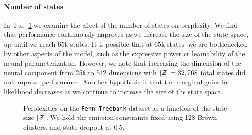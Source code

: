 \documentclass[11pt,a4paper]{article}
\begin{document}
\paragraph{Number of states}
In Tbl.~\ref{tbl:states-ablation} we examine the effect of the 
number of states on perplexity.
We find that performance continuously improves as we increase
the size of the state space, up until we reach 65k states.
It is possible that at 65k states, we are bottlenecked by
other aspects of the model, such as the expressive power
or learnability of the neural parameterization. 
However, we note that increasing the dimension of the neural component from 256 to
512 dimensions with $|\mathcal{Z}| = 32,768$ total states did not improve performance.
Another hypothesis is that the marginal gains in likelihood
decreases as we continue to increase the size of the state space.

\begin{figure}[!t]
\centering
{}
\caption{\label{tbl:states-ablation}
Perplexities on the \texttt{Penn Treebank} dataset
as a function of the state size $|\mathcal{Z}|$.
We hold the emission constraints fixed using 128 Brown clusters,
and state dropout at 0.5.
}
\end{figure}
\end{document}
